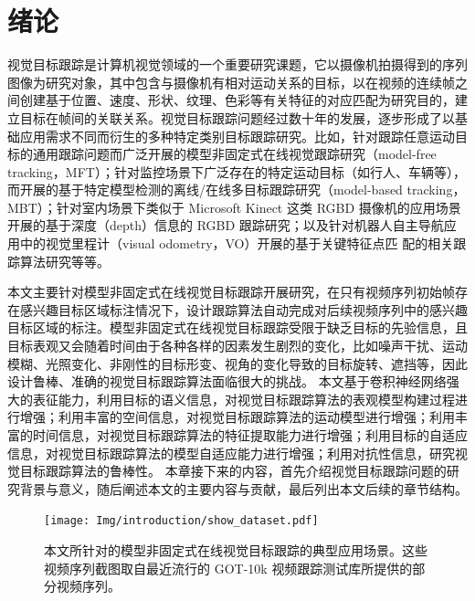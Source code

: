 \chapter{绪论}\label{chap:introduction}
视觉目标跟踪是计算机视觉领域的一个重要研究课题，它以摄像机拍摄得到的序列图像为研究对象，其中包含与摄像机有相对运动关系的目标，以在视频的连续帧之间创建基于位置、速度、形状、纹理、色彩等有关特征的对应匹配为研究目的，建立目标在帧间的关联关系。视觉目标跟踪问题经过数十年的发展，逐步形成了以基础应用需求不同而衍生的多种特定类别目标跟踪研究。比如，针对跟踪任意运动目标的通用跟踪问题而广泛开展的模型非固定式在线视觉跟踪研究（model-free tracking，MFT）；针对监控场景下广泛存在的特定运动目标（如行人、车辆等），而开展的基于特定模型检测的离线/在线多目标跟踪研究（model-based tracking，MBT）；针对室内场景下类似于 Microsoft Kinect 这类 RGBD 摄像机的应用场景开展的基于深度（depth）信息的 RGBD 跟踪研究；以及针对机器人自主导航应用中的视觉里程计（visual odometry，VO）开展的基于关键特征点匹 配的相关跟踪算法研究等等。

本文主要针对模型非固定式在线视觉目标跟踪开展研究，在只有视频序列初始帧存在感兴趣目标区域标注情况下，设计跟踪算法自动完成对后续视频序列中的感兴趣目标区域的标注。模型非固定式在线视觉目标跟踪受限于缺乏目标的先验信息，且目标表观又会随着时间由于各种各样的因素发生剧烈的变化，比如噪声干扰、运动模糊、光照变化、非刚性的目标形变、视角的变化导致的目标旋转、遮挡等，因此设计鲁棒、准确的视觉目标跟踪算法面临很大的挑战。
本文基于卷积神经网络强大的表征能力，利用目标的语义信息，对视觉目标跟踪算法的表观模型构建过程进行增强；利用丰富的空间信息，对视觉目标跟踪算法的运动模型进行增强；利用丰富的时间信息，对视觉目标跟踪算法的特征提取能力进行增强；利用目标的自适应信息，对视觉目标跟踪算法的模型自适应能力进行增强；利用对抗性信息，研究视觉目标跟踪算法的鲁棒性。
本章接下来的内容，首先介绍视觉目标跟踪问题的研究背景与意义，随后阐述本文的主要内容与贡献，最后列出本文后续的章节结构。

\begin{figure}[t]
\centering
\texttt{[image: Img/introduction/show\_dataset.pdf]}
\caption{本文所针对的模型非固定式在线视觉目标跟踪的典型应用场景。这些视频序列截图取自最近流行的 GOT-10k \cite{GOT-10k} 视频跟踪测试库所提供的部分视频序列。}
\end{figure}

